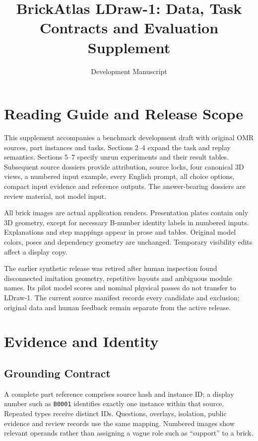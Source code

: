 \documentclass[10pt,letterpaper]{article}
\title{BrickAtlas LDraw-1: Data, Task Contracts and Evaluation Supplement}
\author{Development Manuscript}
\date{}
\begin{document}

\maketitle

\section{Reading Guide and Release Scope}
This supplement accompanies a benchmark development draft with
\LDrawSources{} original OMR sources, \LDrawParts{} part instances and
\LDrawTasks{} tasks. Sections 2--4 expand the task and replay semantics.
Sections 5--7 specify unrun experiments and their result tables.
Subsequent source dossiers provide attribution, source locks, four
canonical 3D views, a numbered input example, every English prompt,
all choice options, compact input evidence and reference outputs.
The answer-bearing dossiers are review material, not model input.

All brick images are actual application renders. Presentation plates
contain only 3D geometry, except for necessary B-number identity labels
in numbered inputs. Explanations and step mappings appear in prose and
tables. Original model colors, poses and dependency geometry are
unchanged. Temporary visibility edits affect a display copy.

The earlier synthetic release was retired after human inspection found
disconnected imitation geometry, repetitive layouts and ambiguous
module names. Its pilot model scores and nominal physical passes do
not transfer to LDraw-1. The current source manifest records every
candidate and exclusion; original data and human feedback remain
separate from the active release.

\section{Evidence and Identity}
\subsection{Grounding Contract}
A complete part reference comprises source hash and instance ID; a
display number such as \texttt{B0001} identifies exactly one instance
within that source. Repeated types receive distinct IDs. Questions,
overlays, isolation, public evidence and review records use the same
mapping. Numbered images show relevant operands rather than assigning
a vague role such as ``support'' to a brick.
\end{document}

